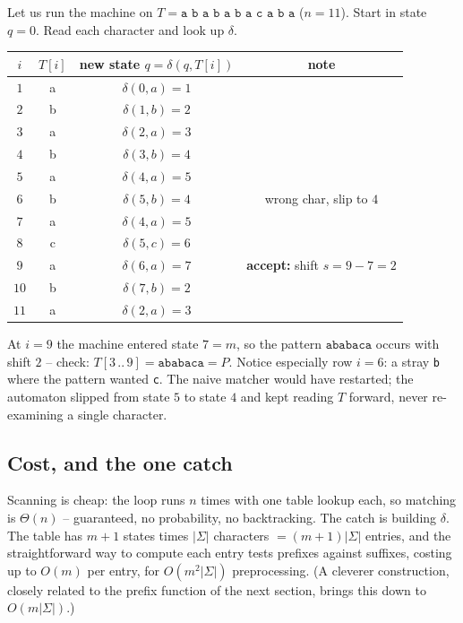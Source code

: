 \begin{labbox}
Let us run the machine on $T = \texttt{a b a b a b a c a b a}$ ($n=11$). Start in
state $q=0$. Read each character and look up $\delta$.

\begin{center}
\begin{tabular}{c c c c}
\toprule
$i$ & $T[i]$ & new state $q=\delta(q,T[i])$ & note \\
\midrule
$1$ & a & $\delta(0,a)=1$ & \\
$2$ & b & $\delta(1,b)=2$ & \\
$3$ & a & $\delta(2,a)=3$ & \\
$4$ & b & $\delta(3,b)=4$ & \\
$5$ & a & $\delta(4,a)=5$ & \\
$6$ & b & $\delta(5,b)=4$ & wrong char, slip to $4$ \\
$7$ & a & $\delta(4,a)=5$ & \\
$8$ & c & $\delta(5,c)=6$ & \\
$9$ & a & $\delta(6,a)=7$ & \textbf{accept:} shift $s=9-7=2$ \\
$10$ & b & $\delta(7,b)=2$ & \\
$11$ & a & $\delta(2,a)=3$ & \\
\bottomrule
\end{tabular}
\end{center}

At $i=9$ the machine entered state $7=m$, so the pattern $\texttt{ababaca}$ occurs
with shift $2$ -- check: $T[3\,..\,9]=\texttt{ababaca}=P$. Notice especially row
$i=6$: a stray \texttt{b} where the pattern wanted \texttt{c}. The naive matcher
would have restarted; the automaton slipped from state $5$ to state $4$ and
kept reading $T$ forward, never re-examining a single character.
\end{labbox}

\subsection{Cost, and the one catch}

Scanning is cheap: the loop runs $n$ times with one table lookup each, so
matching is $\Theta(n)$ -- guaranteed, no probability, no backtracking. The catch
is building $\delta$. The table has $m+1$ states times $|\Sigma|$ characters
$= (m+1)|\Sigma|$ entries, and the straightforward way to compute each entry tests
prefixes against suffixes, costing up to $O(m)$ per entry, for $O(m^2|\Sigma|)$
preprocessing. (A cleverer construction, closely related to the prefix function
of the next section, brings this down to $O(m|\Sigma|)$.)

